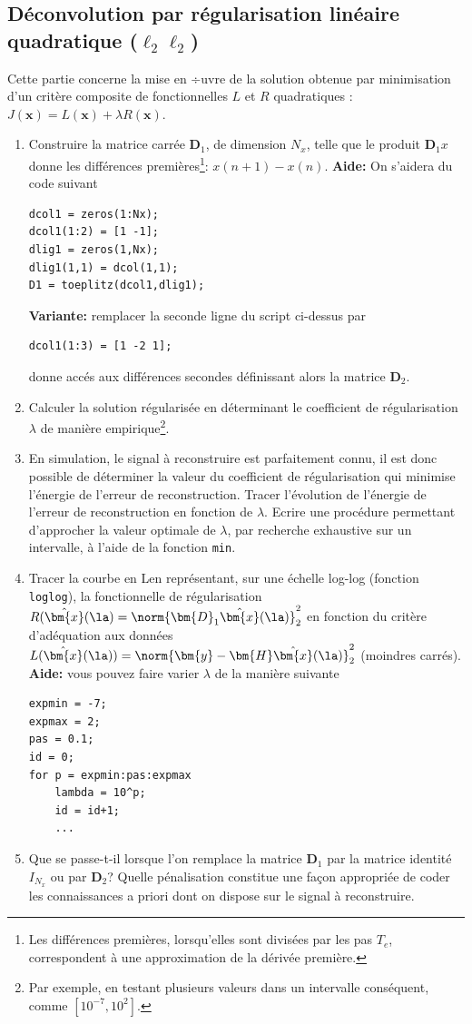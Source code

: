 \subsection{Déconvolution par régularisation linéaire quadratique ($\ell_2\ell_2$)}
Cette partie concerne la mise en ÷uvre de la solution obtenue par minimisation d'un critère composite de fonctionnelles $L$ et $R$ quadratiques : $J(\bm{x}) = L(\bm{x}) + \lambda R(\bm{x})$.
\begin{enumerate}
	\item Construire la matrice carrée $\bm{D}_1$, de dimension $N_x$, telle que le produit $\bm{D}_1x$ donne les
différences premières\footnote{Les différences premières, lorsqu'elles sont divisées par les pas $T_e$, correspondent à une approximation de la dérivée première.}: $x(n + 1) − x(n)$.
\medbreak
\textbf{Aide:} On s'aidera du code suivant
\begin{lstlisting}
dcol1 = zeros(1:Nx);
dcol1(1:2) = [1 -1];
dlig1 = zeros(1,Nx);
dlig1(1,1) = dcol(1,1);
D1 = toeplitz(dcol1,dlig1);
\end{lstlisting}
\medbreak
\textbf{Variante:} remplacer la seconde ligne du script ci-dessus par
\begin{lstlisting}
dcol1(1:3) = [1 -2 1];
\end{lstlisting}
donne accés aux différences secondes définissant alors la matrice $\bm{D}_2$. 
	\item Calculer la solution régularisée en déterminant le coefficient de régularisation $\lambda$ de manière empirique\footnote{Par exemple, en testant plusieurs valeurs dans un intervalle conséquent, comme $[10^{-7},10^2]$.}.
	\item En simulation, le signal à reconstruire est parfaitement connu, il est donc possible de déterminer la valeur du coefficient de régularisation qui minimise l'énergie de l'erreur de
reconstruction. Tracer l'évolution de l'énergie de l'erreur de reconstruction en fonction de $\lambda$. Ecrire une procédure permettant d'approcher la valeur optimale de $\lambda$, par recherche exhaustive sur un intervalle, à l'aide de la fonction \texttt{min}. 
	\item Tracer la \guillemotleft courbe en L\guillemotright en représentant, sur une échelle log-log (fonction \texttt{loglog}), la fonctionnelle de régularisation $R(\hat{\bm{x}}(\la) = \norm{\bm{D}_1\hat{\bm{x}}(\la)}_2^2$ en fonction du critère d'adéquation aux données $L(\hat{\bm{x}}(\la)) = \norm{\bm{y} - \bm{H}\hat{\bm{x}}(\la)}_2^2$ (moindres carrés).
	\medbreak
	\textbf{Aide:} vous pouvez faire varier $\lambda$ de la manière suivante
\begin{lstlisting}
expmin = -7;
expmax = 2;
pas = 0.1;
id = 0;
for p = expmin:pas:expmax
	lambda = 10^p;
	id = id+1;
	...
\end{lstlisting}
	\item Que se passe-t-il lorsque l'on remplace la matrice $\bm{D}_1$ par la matrice identité $I_{N_x}$ ou par $\bm{D}_2$? Quelle pénalisation constitue une façon appropriée de coder les connaissances a priori dont on dispose sur le signal à reconstruire.
\end{enumerate}

